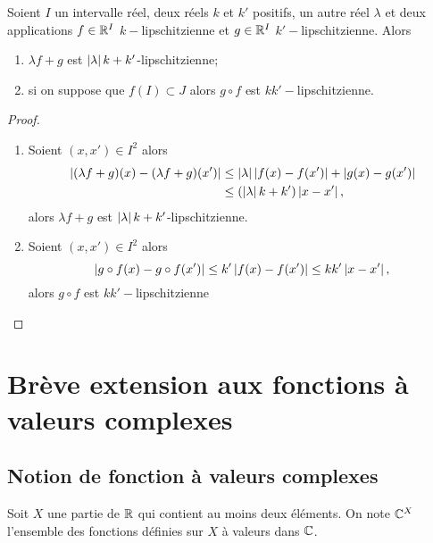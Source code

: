 \begin{prop}
  Soient $I$ un intervalle réel, deux réels $k$ et $k'$ positifs, un autre réel $\lambda$ et deux applications $f\in \mathbb{R}^I$ $k-$lipschitzienne et $g\in \mathbb{R}^I$ $k'-$lipschitzienne. Alors
  \begin{enumerate}
  \item $\lambda f+g$ est $\left\lvert\lambda\right\rvert k+k'$-lipschitzienne;
  \item si on suppose que $f(I) \subset J$ alors $g \circ f$ est $kk'-$lipschitzienne.
  \end{enumerate}
\end{prop}
\begin{proof}
  \begin{enumerate}
  \item Soient $(x,x') \in I^2$ alors
    \begin{align}
      \left\lvert(\lambda f+g)(x)-(\lambda f+g)(x')\right\rvert &\leq \left\lvert\lambda\right\rvert \left\lvert f(x)-f(x')\right\rvert+\left\lvert g(x)-g(x')\right\rvert\\
      &\leq (\left\lvert\lambda\right\rvert k+k')\left\lvert x-x'\right\rvert,
    \end{align}
    alors $\lambda f+g$ est $\left\lvert\lambda\right\rvert k+k'$-lipschitzienne.
  \item Soient $(x,x') \in I^2$ alors
    \begin{equation}
      \left\lvert g \circ f(x)-g \circ f(x')\right\rvert \leq k' \left\lvert f(x)-f(x')\right\rvert \leq kk' \left\lvert x-x'\right\rvert,
    \end{equation}
    alors $g \circ f$ est $kk'-$lipschitzienne
  \end{enumerate}
\end{proof}

\section[Brève extension aux fonctions complexes]{Brève extension aux fonctions à valeurs complexes}

\subsection{Notion de fonction à valeurs complexes}

Soit $X$ une partie de $\mathbb{R}$ qui contient au moins deux éléments. On note $\mathbb{C}^X$ l'ensemble des fonctions définies sur $X$ à valeurs dans $\mathbb{C}$.

